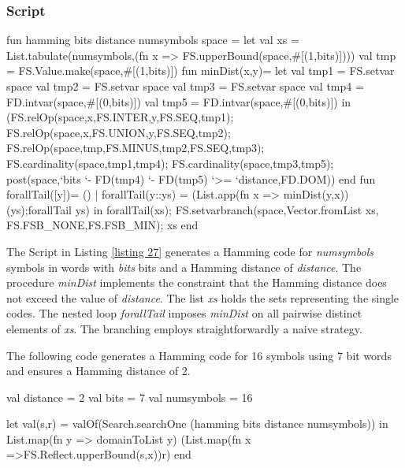 \documentclass[a4paper]{scrartcl}
\begin{document}
\subsubsection{Script}
\begin{myverbatim}

 
fun hamming bits distance numsymbols space =
    let
       val xs = List.tabulate(numsymbols,(fn x => 
                    FS.upperBound(space,#[(1,bits)])))
       val tmp = FS.Value.make(space,#[(1,bits)])
       fun minDist(x,y)= 
           let
              val tmp1 = FS.setvar space
              val tmp2 = FS.setvar space
              val tmp3 = FS.setvar space
              val tmp4 = FD.intvar(space,#[(0,bits)])
              val tmp5 = FD.intvar(space,#[(0,bits)])
           in
             (FS.relOp(space,x,FS.INTER,y,FS.SEQ,tmp1);
              FS.relOp(space,x,FS.UNION,y,FS.SEQ,tmp2);
              FS.relOp(space,tmp,FS.MINUS,tmp2,FS.SEQ,tmp3);
              FS.cardinality(space,tmp1,tmp4);
              FS.cardinality(space,tmp3,tmp5);
              post(space,`bits `- FD(tmp4) `- FD(tmp5) 
                         `>= `distance,FD.DOM))
           end 
       fun forallTail([y])= ()
         | forallTail(y::ys) = (List.app(fn x => 
                          minDist(y,x))(ys);forallTail ys)
    in
       forallTail(xs);
       FS.setvarbranch(space,Vector.fromList xs,
                             FS.FSB_NONE,FS.FSB_MIN);
       xs
    end
\end{myverbatim}


The Script in Listing \ref{listing 27} generates a Hamming 
code for {\it numsymbols} symbols in words with {\it bits} bits 
and a Hamming distance of {\it distance}. The procedure {\it minDist} 
implements the constraint that the Hamming distance does not 
exceed the value of {\it distance}. The list {\it xs} holds the sets 
representing the single codes.
The nested loop {\it forallTail} 
imposes {\it minDist} on all pairwise distinct elements of {\it xs}. 
The branching employs straightforwardly a naive strategy.

The following code generates a Hamming code for 16 symbols 
using 7 bit words and ensures a Hamming distance of 2. 
\lstset{label=listing 28,frame=trbl}
\begin{myverbatim}
val distance = 2
val bits = 7
val numsymbols = 16 

let 
    val(s,r) = valOf(Search.searchOne
                (hamming bits distance numsymbols))
in
    List.map(fn y => domainToList y)
     (List.map(fn x =>FS.Reflect.upperBound(s,x))r)
end 

\end{myverbatim}
\end{document}

